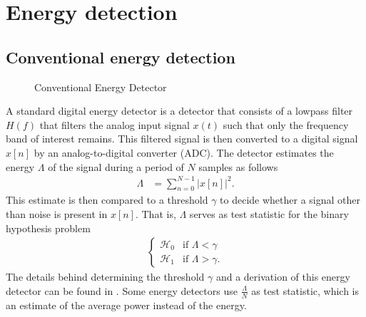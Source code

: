 \documentclass[a4paper, openany, oneside]{memoir}
\begin{document}
\section{Energy detection}

\subsection{Conventional energy detection}\label{sec:conv_ed}
\begin{figure}[H]
\centering
{}
\caption{Conventional Energy Detector}\label{tkz:conv_ed}
\end{figure}
A standard digital energy detector is a detector that consists of a lowpass filter $H(f)$ that filters the analog input signal $x(t)$ such
that only the frequency band of interest remains. This filtered signal is then converted to a digital signal $x[n]$ by an analog-to-digital converter (ADC). The detector estimates the energy $\Lambda$ of the signal during a period of $N$ samples as follows
\begin{align}\label{eq:test_ed}
	\Lambda &= \sum_{n=0}^{N-1} |x[n]|^2.
\end{align}
This estimate is then compared to a threshold $\gamma$ to decide whether a signal other than noise is present in $x[n]$. That is, $\Lambda$ serves as test statistic for the binary hypothesis problem
\begin{align*}
	\begin{cases}
		\mathcal{H}_0 & \text{if } \Lambda < \gamma \\
		\mathcal{H}_1 & \text{if } \Lambda > \gamma.
	\end{cases}
\end{align*}
The details behind determining the threshold $\gamma$ and a derivation of this energy detector can be found in .
Some energy detectors use $\frac{\Lambda}{N}$ as test statistic\cite{chang2008sensing}, which is an estimate of the average power instead of the energy.
\end{document}
